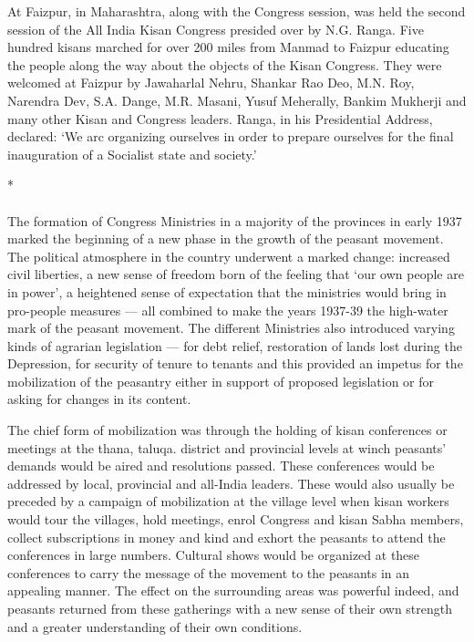 At Faizpur, in Maharashtra, along with the Congress session, was held the second session of the All India Kisan Congress presided over by N.G. Ranga. Five hundred kisans marched for over 200 miles from Manmad to Faizpur educating the people along the way about the objects of the Kisan Congress. They were welcomed at Faizpur by Jawaharlal Nehru, Shankar Rao Deo, M.N. Roy, Narendra Dev, S.A. Dange, M.R. Masani, Yusuf Meherally, Bankim Mukherji and many other Kisan and Congress leaders. Ranga, in his Presidential Address, declared: `We arc organizing ourselves in order to prepare ourselves for the final inauguration of a Socialist state and society.'

\begin{center}*\end{center}

\paragraph*{}


The formation of Congress Ministries in a majority of the provinces in early 1937 marked the beginning of a new phase in the growth of the peasant movement. The political atmosphere in the country underwent a marked change: increased civil liberties, a new sense of freedom born of the feeling that `our own people are in power', a heightened sense of expectation that the ministries would bring in pro-people measures — all combined to make the years 1937-39 the high-water mark of the peasant movement. The different Ministries also introduced varying kinds of agrarian legislation — for debt relief, restoration of lands lost during the Depression, for security of tenure to tenants and this provided an impetus for the mobilization of the peasantry either in support of proposed legislation or for asking for changes in its content.

The chief form of mobilization was through the holding of kisan conferences or meetings at the thana, taluqa. district and provincial levels at winch peasants' demands would be aired and resolutions passed. These conferences would be addressed by local, provincial and all-India leaders. These would also usually be preceded by a campaign of mobilization at the village level when kisan workers would tour the villages, hold meetings, enrol Congress and kisan Sabha members, collect subscriptions in money and kind and exhort the peasants to attend the conferences in large numbers. Cultural shows would be organized at these conferences to carry the message of the movement to the peasants in an appealing manner. The effect on the surrounding areas was powerful indeed, and peasants returned from these gatherings with a new sense of their own strength and a greater understanding of their own conditions.

